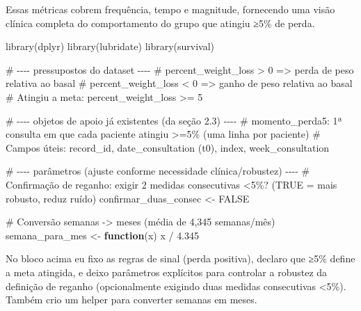 \documentclass[
]{article}
\newenvironment{Shaded}{\begin{snugshade}}{\end{snugshade}}
\newcommand{\CommentTok}[1]{\textcolor[rgb]{0.37,0.37,0.37}{#1}}
\newcommand{\ConstantTok}[1]{\textcolor[rgb]{0.56,0.35,0.01}{#1}}
\newcommand{\ControlFlowTok}[1]{\textcolor[rgb]{0.00,0.23,0.31}{\textbf{#1}}}
\newcommand{\FloatTok}[1]{\textcolor[rgb]{0.68,0.00,0.00}{#1}}
\newcommand{\FunctionTok}[1]{\textcolor[rgb]{0.28,0.35,0.67}{#1}}
\newcommand{\NormalTok}[1]{\textcolor[rgb]{0.00,0.23,0.31}{#1}}
\newcommand{\OtherTok}[1]{\textcolor[rgb]{0.00,0.23,0.31}{#1}}
\newcommand{\SpecialCharTok}[1]{\textcolor[rgb]{0.37,0.37,0.37}{#1}}
\begin{document}
Essas métricas cobrem frequência, tempo e magnitude, fornecendo uma
visão clínica completa do comportamento do grupo que atingiu ≥5\% de
perda.

\begin{Shaded}
\begin{Highlighting}[]
\FunctionTok{library}\NormalTok{(dplyr)}
\FunctionTok{library}\NormalTok{(lubridate)}
\FunctionTok{library}\NormalTok{(survival)}

\CommentTok{\# {-}{-}{-}{-} pressupostos do dataset {-}{-}{-}{-}}
\CommentTok{\# percent\_weight\_loss \textgreater{} 0  =\textgreater{} perda de peso relativa ao basal}
\CommentTok{\# percent\_weight\_loss \textless{} 0  =\textgreater{} ganho de peso relativa ao basal}
\CommentTok{\# Atingiu a meta: percent\_weight\_loss \textgreater{}= 5}

\CommentTok{\# {-}{-}{-}{-} objetos de apoio já existentes (da seção 2.3) {-}{-}{-}{-}}
\CommentTok{\# momento\_perda5: 1ª consulta em que cada paciente atingiu \textgreater{}=5\% (uma linha por paciente)}
\CommentTok{\# Campos úteis: record\_id, date\_consultation (t0), index, week\_consultation}

\CommentTok{\# {-}{-}{-}{-} parâmetros (ajuste conforme necessidade clínica/robustez) {-}{-}{-}{-}}
\CommentTok{\# Confirmação de reganho: exigir 2 medidas consecutivas \textless{}5\%? (TRUE = mais robusto, reduz ruído)}
\NormalTok{confirmar\_duas\_consec }\OtherTok{\textless{}{-}} \ConstantTok{FALSE}

\CommentTok{\# Conversão semanas {-}\textgreater{} meses (média de 4,345 semanas/mês)}
\NormalTok{semana\_para\_mes }\OtherTok{\textless{}{-}} \ControlFlowTok{function}\NormalTok{(x) x }\SpecialCharTok{/} \FloatTok{4.345}
\end{Highlighting}
\end{Shaded}

No bloco acima eu fixo as regras de sinal (perda positiva), declaro que
≥5\% define a meta atingida, e deixo parâmetros explícitos para
controlar a robustez da definição de reganho (opcionalmente exigindo
duas medidas consecutivas \textless5\%). Também crio um helper para
converter semanas em meses.
\end{document}
